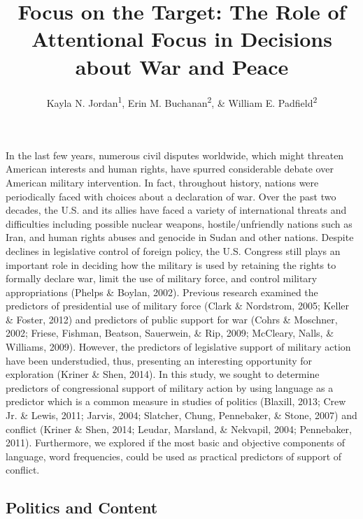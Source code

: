 \documentclass[english,man]{apa6}
\title{Focus on the Target: The Role of Attentional Focus in Decisions about
War and Peace}
\author{Kayla N. Jordan\textsuperscript{1}, Erin M. Buchanan\textsuperscript{2}, \& William E. Padfield\textsuperscript{2}}
\affiliation{
    \vspace{0.5cm}
          \textsuperscript{1} University of Texas - Austin\\
          \textsuperscript{2} Missouri State University  }
\theoremstyle{definition}
\theoremstyle{definition}
\theoremstyle{definition}
\theoremstyle{remark}
\begin{document}
\maketitle

\setcounter{secnumdepth}{0}



In the last few years, numerous civil disputes worldwide, which might
threaten American interests and human rights, have spurred considerable
debate over American military intervention. In fact, throughout history,
nations were periodically faced with choices about a declaration of war.
Over the past two decades, the U.S. and its allies have faced a variety
of international threats and difficulties including possible nuclear
weapons, hostile/unfriendly nations such as Iran, and human rights
abuses and genocide in Sudan and other nations. Despite declines in
legislative control of foreign policy, the U.S. Congress still plays an
important role in deciding how the military is used by retaining the
rights to formally declare war, limit the use of military force, and
control military appropriations (Phelps \& Boylan, 2002). Previous
research examined the predictors of presidential use of military force
(Clark \& Nordstrom, 2005; Keller \& Foster, 2012) and predictors of
public support for war (Cohrs \& Moschner, 2002; Friese, Fishman,
Beatson, Sauerwein, \& Rip, 2009; McCleary, Nalls, \& Williams, 2009).
However, the predictors of legislative support of military action have
been understudied, thus, presenting an interesting opportunity for
exploration (Kriner \& Shen, 2014). In this study, we sought to
determine predictors of congressional support of military action by
using language as a predictor which is a common measure in studies of
politics (Blaxill, 2013; Crew Jr. \& Lewis, 2011; Jarvis, 2004;
Slatcher, Chung, Pennebaker, \& Stone, 2007) and conflict (Kriner \&
Shen, 2014; Leudar, Marsland, \& Nekvapil, 2004; Pennebaker, 2011).
Furthermore, we explored if the most basic and objective components of
language, word frequencies, could be used as practical predictors of
support of conflict.

\subsection{Politics and Content}\label{politics-and-content}
\end{document}
